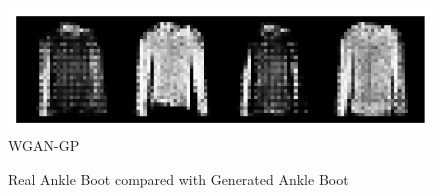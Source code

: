 \documentclass{article}
\begin{document}
\begin{figure}[ht]
{\begin{minipage}[t]{0.45\textwidth}
        \includegraphics[width=\textwidth]{../src/gp_pullover.png}
        \caption{WGAN-GP}
        \label{fig:image3}
    \end{minipage}
    }
\end{figure}


\begin{figure}[ht]
    \caption{Real Ankle Boot compared with Generated Ankle Boot}
    \centering
\end{figure}
\end{document}
